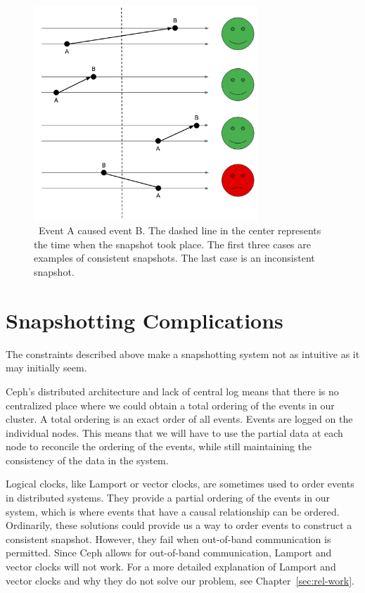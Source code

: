 \begin{figure}[!htbp]
  \centering
  \caption{~Event A caused event B. The dashed line in the center represents the time when the snapshot took place. The first three cases are examples of consistent snapshots. The last case is an inconsistent snapshot.} 
  \label{fig:consistency}
  \includegraphics[width=0.75\textwidth]{consistency.png}
\end{figure}

\section{Snapshotting Complications}

The constraints described above make a snapshotting system not as
intuitive as it may initially seem.

Ceph's distributed architecture and lack of central log means that
there is no centralized place where we could obtain a total ordering
of the events in our cluster. A total ordering is an exact order of
all events. Events are logged on the individual nodes. This means that
we will have to use the partial data at each node to reconcile the
ordering of the events, while still maintaining the consistency of the
data in the system.

Logical clocks, like Lamport or vector clocks, are sometimes used to
order events in distributed systems. They provide a partial ordering
of the events in our system, which is where events that have a causal
relationship can be ordered. Ordinarily, these solutions could provide
us a way to order events to construct a consistent snapshot. However,
they fail when out-of-band communication is permitted. Since Ceph
allows for out-of-band communication, Lamport and vector clocks will
not work. For a more detailed explanation of Lamport and vector clocks
and why they do not solve our problem, see Chapter~\ref{sec:rel-work}.

